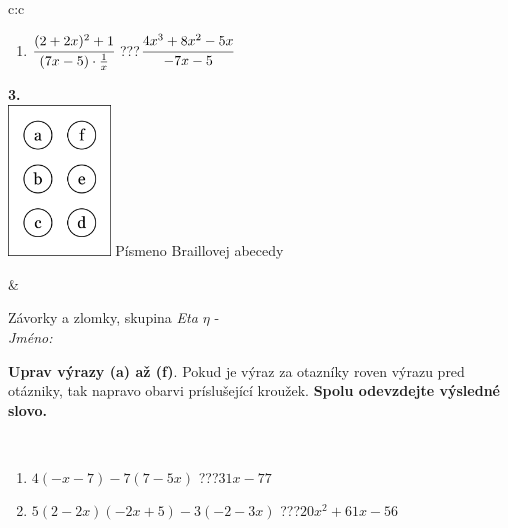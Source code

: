 \documentclass[10pt]{report}
\begin{document}
\begin{tabular}{c:c}
\begin{minipage}[c][104.5mm][t]{0.5\linewidth}
\begin{center}
\begin{minipage}{0.79\linewidth}
\begin{center}
\begin{varwidth}{\linewidth}
\begin{enumerate}
\item $\cfrac{(2+2x)^2+1}{(7x-5)\cdot\frac{1}{x}}$\quad \dotfill\; ???\;\dotfill \quad $\cfrac{4x^3+8x^2-5x}{-7x-5}$
\end{enumerate}
\end{varwidth}
\end{center}
\end{minipage}
\begin{minipage}{0.20\linewidth}
\begin{center}
{\Huge\bfseries 3.} \\[2mm]
\includegraphics[height=40mm]{../images/braille.png}
{\small Písmeno Braillovej abecedy}
\end{center}
\end{minipage}
\end{center}
\end{minipage}
&
\begin{minipage}[c][104.5mm][t]{0.5\linewidth}
\begin{center}
\vspace{7mm}
{\huge Závorky a zlomky, skupina \textit{Eta $\eta$} -}\\[5mm]
\textit{Jméno:}\phantom{xxxxxxxxxxxxxxxxxxxxxxxxxxxxxxxxxxxxxxxxxxxxxxxxxxxxxxxxxxxxxxxxx}\\[5mm]
\begin{minipage}{0.95\linewidth}
\begin{center}
\textbf{Uprav výrazy (a) až (f)}. Pokud je výraz za otazníky roven výrazu pred otázniky, tak napravo obarvi príslušející kroužek. \textbf{Spolu odevzdejte výsledné slovo.}
\end{center}
\end{minipage}
\\[1mm]
\begin{minipage}{0.79\linewidth}
\begin{center}
\begin{varwidth}{\linewidth}
\begin{enumerate}
\normalsize
\item $4(-x-7)-7(7-5x)$\quad \dotfill\; ???\;\dotfill \quad $31x-77$
\item $5(2-2x)(-2x+5)-3(-2-3x)$\quad \dotfill\; ???\;\dotfill \quad $20x^2+61x-56$

\end{enumerate}
\end{varwidth}
\end{center}
\end{minipage}
\end{center}
\end{minipage}
\end{tabular}
\end{document}
